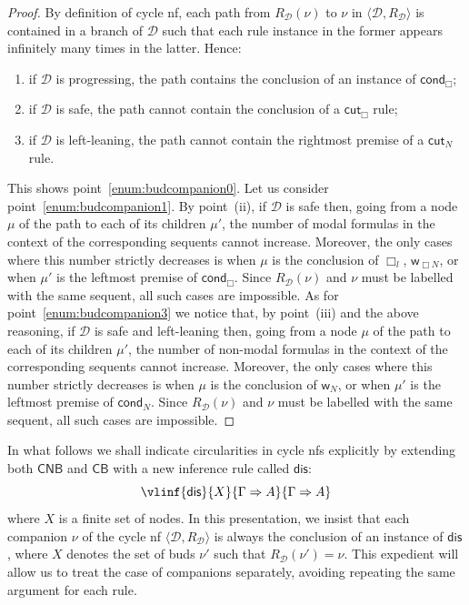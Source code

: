 \documentclass[manuscript,screen]{acmart}
\theoremstyle{definition}
\theoremstyle{remark}
\newcommand{\n}{N}
\newcommand{\sq}{\Box}
\newcommand{\sqn}{{\sq\n}}
\newcommand{\sn}{\sqn}
\newcommand{\cnd}{\mathsf{cond}}
\newcommand{\bc}{\mathsf{B}}
\newcommand{\nested}{\mathsf{N}}
\newcommand{\der}{\mathcal{D}}
\newcommand{\rd}{{R}_\der}
\newcommand{\derrd}{\langle \der, \rd \rangle}
\newcommand{\wk}{\mathsf{w}}
\newcommand{\cut}{\mathsf{cut}}
\newcommand{\boxlef}{\sq_l}
\newcommand{\sql}{\boxlef}
\newcommand{\com}{\mathsf{dis}}
\newcommand{\cyclic}{\mathsf{C}}
\newcommand{\cbc}{\cyclic\bc}
\newcommand{\ncbc}{\cyclic\nested\bc}
\begin{document}
\begin{proof}
By definition of cycle nf, each path from $\rd(\nu)$ to $\nu$ in $\derrd$ is contained in a branch of $\der$ such that each rule instance in the former appears  infinitely many times in the latter. Hence:
\begin{enumerate}
\item[(i)]  if $\der$ is progressing,  the path contains the conclusion of an instance of $\cnd_{\sq}$;
\item[(ii)]  if $\der$ is safe, the path   cannot contain the conclusion of a $\cut_{\sq}$ rule;
\item[(iii)] if $\der$ is left-leaning, the path    cannot contain the rightmost premise of a $\cut_{\n}$ rule.
\end{enumerate}
This shows point~\ref{enum:budcompanion0}. Let us consider  point~\ref{enum:budcompanion1}.  By point~(ii), if $\der$ is safe then,  going from a node $\mu$ of the path to each of its children $\mu'$,  the number of modal formulas in the context of the corresponding sequents cannot increase.  Moreover, the only cases where this number strictly decreases is when $\mu$ is the conclusion of $\sql$,  $\wk_{\sn}$, or  when $\mu'$ is  the leftmost premise of $\cnd_{\sq}$. Since $\rd(\nu)$ and $\nu$ must be labelled with the same sequent, all such cases are impossible. As for  point~\ref{enum:budcompanion3} we notice that,   by point~(iii) and the above reasoning, if $\der$ is safe and left-leaning then,  going from a node $\mu$ of the path to each of its children $\mu'$,  the number of non-modal formulas in the context of the corresponding sequents cannot increase.  Moreover, the only cases where this number strictly decreases is when $\mu$ is the conclusion of $\wk_{\n}$, or  when $\mu'$ is  the leftmost premise of $\cnd_{\n}$. Since $\rd(\nu)$ and $\nu$ must be labelled with the same sequent, all such cases are impossible. 
\end{proof} 

In what follows we shall indicate circularities in cycle nfs explicitly by extending both $\ncbc$ and  $\cbc$ with a new inference rule called $\com$: 
\[
\vlinf{\com}{X}{\Gamma \Rightarrow A}{\Gamma \Rightarrow A}
\]
where $X$ is a finite set of nodes. 
In this presentation, we insist that each companion $\nu$ of the cycle nf $\derrd$ is always the conclusion of an instance of $\com$, where $X$ denotes the set of buds $\nu'$ such that $\rd(\nu')=\nu$.  
{This expedient will allow us to treat the case of companions separately, avoiding repeating the same argument for each rule.}
\end{document}
